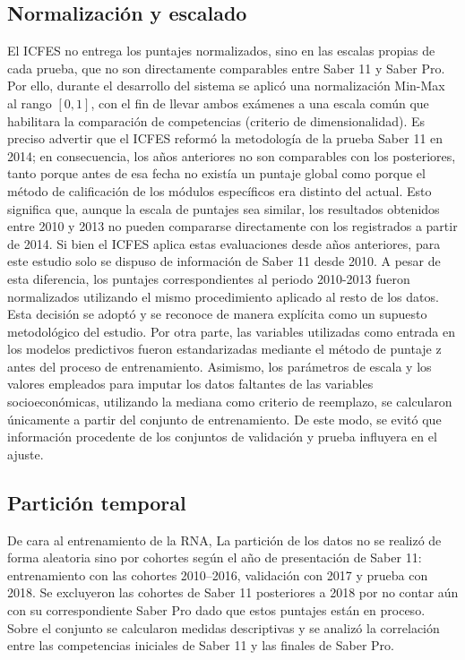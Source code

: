 \subsection{Normalización y escalado}
El ICFES no entrega los puntajes normalizados, sino en las escalas propias de cada prueba, que no son directamente comparables entre Saber 11 y Saber Pro. Por ello, durante el desarrollo del sistema se aplicó una normalización Min-Max al rango $[0, 1]$, con el fin de llevar ambos exámenes a una escala común que habilitara la comparación de competencias (criterio de dimensionalidad). Es preciso advertir que el ICFES reformó la metodología de la prueba Saber 11 en 2014; en consecuencia, los años anteriores no son comparables con los posteriores, tanto porque antes de esa fecha no existía un puntaje global como porque el método de calificación de los módulos específicos era distinto del actual. Esto significa que, aunque la escala de puntajes sea similar, los resultados obtenidos entre 2010 y 2013 no pueden compararse directamente con los registrados a partir de 2014. Si bien el ICFES aplica estas evaluaciones desde años anteriores, para este estudio solo se dispuso de información de Saber 11 desde 2010. A pesar de esta diferencia, los puntajes correspondientes al periodo 2010-2013 fueron normalizados utilizando el mismo procedimiento aplicado al resto de los datos. Esta decisión se adoptó y se reconoce de manera explícita como un supuesto metodológico del estudio. Por otra parte, las variables utilizadas como entrada en los modelos predictivos fueron estandarizadas mediante el método de puntaje z antes del proceso de entrenamiento. Asimismo, los parámetros de escala y los valores empleados para imputar los datos faltantes de las variables socioeconómicas, utilizando la mediana como criterio de reemplazo, se calcularon únicamente a partir del conjunto de entrenamiento. De este modo, se evitó que información procedente de los conjuntos de validación y prueba influyera en el ajuste.

\subsection{Partición temporal}
De cara al entrenamiento de la RNA, La partición de los datos no se realizó de forma aleatoria sino por cohortes según el año de presentación de Saber 11: entrenamiento con las cohortes 2010–2016, validación con 2017 y prueba con 2018. Se excluyeron las cohortes de Saber 11 posteriores a 2018 por no contar aún con su correspondiente Saber Pro dado que estos puntajes están en proceso. Sobre el conjunto se calcularon medidas descriptivas y se analizó la correlación entre las competencias iniciales de Saber 11 y las finales de Saber Pro.

